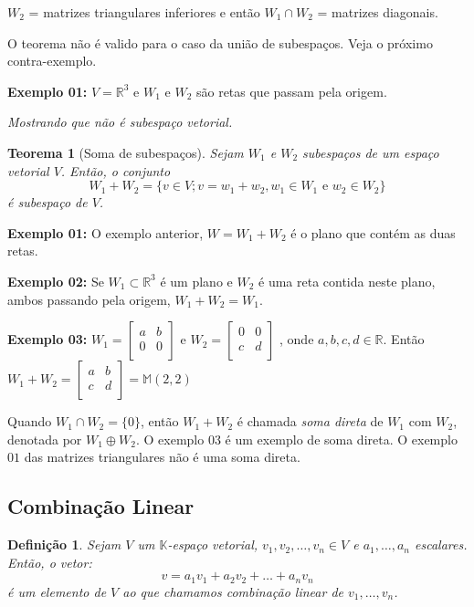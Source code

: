 \documentclass[oneside,a4paper,12pt]{article}
\newtheorem{theorem}{Teorema}[section]
\newtheorem{definition}{Definição}[section]
\begin{document}
$W_2$ = {matrizes triangulares inferiores} e então $W_1 \cap W_2$ = {matrizes diagonais}.

O teorema não é valido para o caso da união de subespaços. Veja o próximo contra-exemplo.

{\bf Exemplo 01:} $V = \mathbb{R}^3$ e $W_1$ e $W_2$ são retas que passam pela origem.

\emph{Mostrando que não é subespaço vetorial.}
\vspace{50pt}

\begin{theorem}[Soma de subespaços]
	Sejam $W_1$ e $W_2$ subespaços de um espaço vetorial $V$. Então, o conjunto
	$$W_1 + W_2 = \{v \in V; v = w_1 + w_2, w_1 \in W_1 \text{ e } w_2 \in W_2 \}$$
	é subespaço de $V$.
\end{theorem}

{\bf Exemplo 01:} O exemplo anterior, $W = W_1 + W_2$ é o plano que contém as duas retas.

{\bf Exemplo 02:} Se $W_1 \subset \mathbb{R}^3$ é um plano e $W_2$ é uma reta contida neste plano, ambos passando pela origem, $W_1 + W_2 = W_1$.

{\bf Exemplo 03:} $W_1 = \left[
\begin{array}{cc}
	a	&	b	\\
	0	&	0	\\
\end{array}
\right]
$
 e $W_2 = \left[
 \begin{array}{cc}
 0	&	0	\\
 c	&	d	\\
 \end{array}
 \right]
 $
, onde $a,b,c,d \in \mathbb{R}$. Então $W_1 + W_2 = \left[
\begin{array}{cc}
a	&	b	\\
c	&	d	\\
\end{array}
\right]
= \mathbb{M}(2,2)
$

Quando $W_1 \cap W_2 = \{0\}$, então $W_1 + W_2$ é chamada \emph{soma direta} de $W_1$ com $W_2$, denotada por $W_1 \oplus W_2$. O exemplo $03$ é um exemplo de soma direta. O exemplo $01$ das matrizes triangulares não é uma soma direta.

\subsection{Combinação Linear}
\begin{definition}
	Sejam $V$ um $\mathbb{K}$-espaço vetorial, $v_1, v_2, \dots, v_n \in V$ e $a_1, \dots, a_n$ escalares. Então, o vetor:
	$$v = a_1 v_1 + a_2 v_2 + \dots + a_n v_n$$
	é um elemento de $V$ ao que chamamos \emph{combinação linear} de $v_1, \dots, v_n$.
\end{definition}
\end{document}
